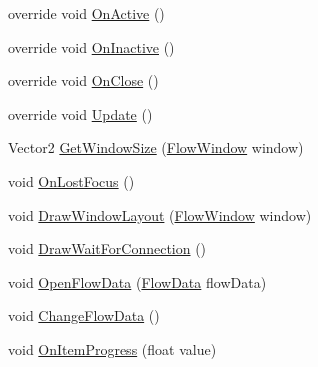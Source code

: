 \begin{DoxyCompactItemize}
\item 
override void \hyperlink{class_unity_editor_1_1_u_i_1_1_windows_1_1_plugins_1_1_flow_1_1_flow_system_editor_window_ac90f52f832902f039932682feefd2745}{On\+Active} ()
\item 
override void \hyperlink{class_unity_editor_1_1_u_i_1_1_windows_1_1_plugins_1_1_flow_1_1_flow_system_editor_window_a07d7bd30cc3009d66e70940692bdaf70}{On\+Inactive} ()
\item 
override void \hyperlink{class_unity_editor_1_1_u_i_1_1_windows_1_1_plugins_1_1_flow_1_1_flow_system_editor_window_a39be2531f27ce821174171883c412603}{On\+Close} ()
\item 
override void \hyperlink{class_unity_editor_1_1_u_i_1_1_windows_1_1_plugins_1_1_flow_1_1_flow_system_editor_window_a78f4e2ac64430d5c985f487e1dc75e20}{Update} ()
\item 
Vector2 \hyperlink{class_unity_editor_1_1_u_i_1_1_windows_1_1_plugins_1_1_flow_1_1_flow_system_editor_window_aeec06c4dd9b742a6abc08fb685b5770d}{Get\+Window\+Size} (\hyperlink{class_unity_engine_1_1_u_i_1_1_windows_1_1_plugins_1_1_flow_1_1_flow_window}{Flow\+Window} window)
\item 
void \hyperlink{class_unity_editor_1_1_u_i_1_1_windows_1_1_plugins_1_1_flow_1_1_flow_system_editor_window_a59222ee674fe24a7ae974d4560d6cd4d}{On\+Lost\+Focus} ()
\item 
void \hyperlink{class_unity_editor_1_1_u_i_1_1_windows_1_1_plugins_1_1_flow_1_1_flow_system_editor_window_acc979d70417f91af2d7bae2903f0bdff}{Draw\+Window\+Layout} (\hyperlink{class_unity_engine_1_1_u_i_1_1_windows_1_1_plugins_1_1_flow_1_1_flow_window}{Flow\+Window} window)
\item 
void \hyperlink{class_unity_editor_1_1_u_i_1_1_windows_1_1_plugins_1_1_flow_1_1_flow_system_editor_window_a91ff430973e4ebbbbc6a818052efc292}{Draw\+Wait\+For\+Connection} ()
\item 
void \hyperlink{class_unity_editor_1_1_u_i_1_1_windows_1_1_plugins_1_1_flow_1_1_flow_system_editor_window_a16cd5f28ca1f010a849db595871b5148}{Open\+Flow\+Data} (\hyperlink{class_unity_engine_1_1_u_i_1_1_windows_1_1_plugins_1_1_flow_1_1_flow_data}{Flow\+Data} flow\+Data)
\item 
void \hyperlink{class_unity_editor_1_1_u_i_1_1_windows_1_1_plugins_1_1_flow_1_1_flow_system_editor_window_a20e95f89886aa82d9e7b6daa2fe73978}{Change\+Flow\+Data} ()
\item 
void \hyperlink{class_unity_editor_1_1_u_i_1_1_windows_1_1_plugins_1_1_flow_1_1_flow_system_editor_window_a4bdd4749150859a2053fb9fcc68bfd36}{On\+Item\+Progress} (float value)
\end{DoxyCompactItemize}
